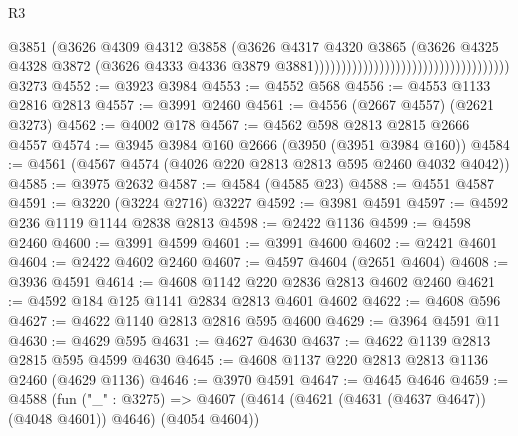 \begin{lexlean}{R3}
\begin{coremodule}
                                                                    @3851
                                                                    (@3626
                                                                      @4309
                                                                      @4312
                                                                      @3858
                                                                      (@3626
                                                                        @4317
                                                                        @4320
                                                                        @3865
                                                                        (@3626
                                                                          @4325
                                                                          @4328
                                                                          @3872
                                                                          (@3626
                                                                            @4333
                                                                            @4336
                                                                            @3879
                                                                            @3881))))))))))))))))))))))))))))))))))))
    @3273
@4552 := @3923 @3984
@4553 := @4552 @568
@4556 := @4553 @1133 @2816 @2813
@4557 := @3991 @2460
@4561 := @4556 (@2667 @4557) (@2621 @3273)
@4562 := @4002 @178
@4567 := @4562 @598 @2813 @2815 @2666 @4557
@4574 := @3945 @3984 @160 @2666 (@3950 (@3951 @3984 @160))
@4584 := @4561 (@4567 @4574 (@4026 @220 @2813 @2813 @595 @2460 @4032 @4042))
@4585 := @3975 @2632
@4587 := @4584 (@4585 @23)
@4588 := @4551 @4587
@4591 := @3220 (@3224 @2716) @3227
@4592 := @3981 @4591
@4597 := @4592 @236 @1119 @1144 @2838 @2813
@4598 := @2422 @1136
@4599 := @4598 @2460
@4600 := @3991 @4599
@4601 := @3991 @4600
@4602 := @2421 @4601
@4604 := @2422 @4602 @2460
@4607 := @4597 @4604 (@2651 @4604)
@4608 := @3936 @4591
@4614 := @4608 @1142 @220 @2836 @2813 @4602 @2460
@4621 := @4592 @184 @125 @1141 @2834 @2813 @4601 @4602
@4622 := @4608 @596
@4627 := @4622 @1140 @2813 @2816 @595 @4600
@4629 := @3964 @4591 @11
@4630 := @4629 @595
@4631 := @4627 @4630
@4637 := @4622 @1139 @2813 @2815 @595 @4599 @4630
@4645 := @4608 @1137 @220 @2813 @2813 @1136 @2460 (@4629 @1136)
@4646 := @3970 @4591
@4647 := @4645 @4646
@4659 := @4588
    (fun ("_" : @3275) =>
    @4607 (@4614 (@4621 (@4631 (@4637 @4647)) (@4048 @4601)) @4646) (@4054 @4604))

\end{coremodule}
\end{lexlean}

